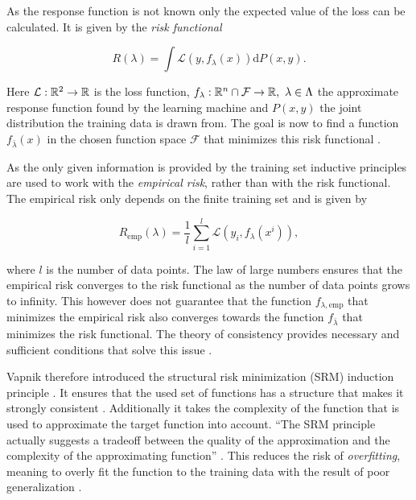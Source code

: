 As the response function is not known only the expected value of the loss can be calculated. It is given by the \emph{risk functional} 

\begin{equation}
	R(\lambda) = \int{\mathcal{L}(y,f_{\lambda}(x))\text{d}P(x,y)}.
\label{risk_func}
\end{equation}

Here \(\mathcal{L}: \mathbb{R}^2 \to \mathbb{R}\) is the loss function, \(f_{\lambda}: \mathbb{R}^{n}\cap\mathcal{F} \to \mathbb{R}, ~ \lambda \in \Lambda\) the approximate response function found by the learning machine and \(P(x,y)\) the joint distribution the training data is drawn from. The goal is now to find a function \(f_{\bar{\lambda}}(x)\) in the chosen function space \(\mathcal{F}\) that minimizes this risk functional \cite[989]{Vapnik1999}.

As the only given information is provided by the training set inductive principles are used to work with the \emph{empirical risk}, rather than with the risk functional.
The empirical risk only depends on the finite training set  and is given by 


\begin{equation}
	R_{\text{emp}}(\lambda) = \frac{1}{l} \sum_{i = 1}^{l}\mathcal{L}(y_i,f_{\lambda}(x^i)),
\label{emp_risk}
\end{equation}

where \(l\) is the number of data points.
The law of large numbers ensures that the empirical risk converges to the risk functional as the number of data points grows to infinity. This however does not guarantee that the function \(f_{\lambda,\text{emp}}\) that minimizes the empirical risk also converges towards the function \(f_{\bar{\lambda}}\) that minimizes the risk functional.
The theory of consistency provides necessary and sufficient conditions that solve this issue  \cite[p. 989]{Vapnik1999}.

Vapnik therefore introduced the structural risk minimization (SRM) induction principle . It ensures that the used set of functions has a structure that makes it strongly consistent \cite{Vapnik1999}. Additionally it takes the complexity of the function that is used to approximate the target function into account. ``The SRM principle actually suggests a tradeoff between the quality of the approximation and the complexity of the approximating function'' \cite[p. 994]{Vapnik1999}.
This reduces the risk of \emph{overfitting}, meaning to overly fit the function to the training data with the result of poor generalization \cite[chapter 1.3]{Cristianini2000}.

